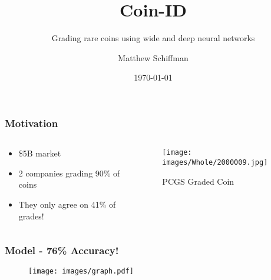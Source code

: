 \documentclass[11pt]{beamer}
\begin{document}
\author{Matthew Schiffman}
\title{Coin-ID}
\subtitle{Grading rare coins using wide and deep neural networks}
\date{\today}
\begin{frame}
	\titlepage
\end{frame}
\begin{frame}
	\frametitle{Motivation}
	\begin{columns}[onlytextwidth]
		\begin{column}{.5\textwidth}
		\begin{itemize}
			\item \$5B market
			\item 2 companies grading 90\% of coins
			\item They only agree on 41\% of grades!
		\end{itemize}
		\end{column}
		\begin{column}{.5\textwidth}
			\begin{figure}
				\centering
				\texttt{[image: images/Whole/2000009.jpg]}
				\caption{PCGS Graded Coin}
			\end{figure}
		\end{column}
	\end{columns}
\end{frame}
\begin{frame}
	\frametitle{ Model - 76\% Accuracy!}
	\begin{figure}
		\centering
		\texttt{[image: images/graph.pdf]}
		\label{fig:graph}
	\end{figure}
\end{frame}
\end{document}
